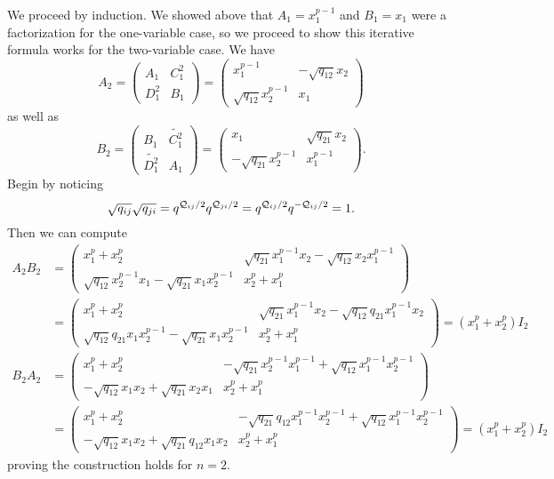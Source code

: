 \documentclass[12pt]{article}
\begin{document}
\begin{prf}
    We proceed by induction. We showed above that $A_1=x_1^{p-1}$ and $B_1=x_1$ were a factorization for the one-variable case, so we proceed to show this iterative formula works for the two-variable case. We have
    \[A_2=\begin{pmatrix}A_1 & C_1^2\\ D_1^2& B_1\end{pmatrix}=\begin{pmatrix}x_1^{p-1} & -\sqrt{q_{12}}x_2\\ \sqrt{q_{12}}x_2^{p-1} & x_1\end{pmatrix}\]
    as well as
    \[B_2=\begin{pmatrix}B_1 & \widetilde{C_1^2}\\\widetilde{D_1^2} & A_1\end{pmatrix}= \begin{pmatrix}x_1 & \sqrt{q_{21}}x_2\\ -\sqrt{q_{21}}x_2^{p-1} & x_1^{p-1}\end{pmatrix}.\]
    Begin by noticing
    \[\sqrt{q_{ij}}\sqrt{q_{ji}} = q^{\mathcal{Q}_{ij}/2}q^{\mathcal{Q}_{ji}/2}=q^{\mathcal{Q}_{ij}/2}q^{-\mathcal{Q}_{ij}/2}=1.\]
    Then we can compute
    \begin{align*}
    A_2B_2&=\begin{pmatrix}x_1^p + x_2^p & \sqrt{q_{21}}x_1^{p-1}x_2 - \sqrt{q_{12}}x_2x_1^{p-1}\\
    \sqrt{q_{12}}x_2^{p-1}x_1 - \sqrt{q_{21}}x_1x_2^{p-1} & x_2^p+x_1^p\end{pmatrix}\\
    &=\begin{pmatrix}x_1^p + x_2^p & \sqrt{q_{21}}x_1^{p-1}x_2 - \sqrt{q_{12}}q_{21}x_1^{p-1}x_2\\
    \sqrt{q_{12}}q_{21}x_1x_2^{p-1} - \sqrt{q_{21}}x_1x_2^{p-1} & x_2^p+x_1^p\end{pmatrix}=(x_1^p+x_2^p)I_2
    \end{align*}
    \begin{align*}
    B_2A_2&=\begin{pmatrix}x_1^p + x_2^p & -\sqrt{q_{21}}x_2^{p-1}x_1^{p-1}+\sqrt{q_{12}}x_1^{p-1}x_2^{p-1}\\
    -\sqrt{q_{12}}x_1x_2 + \sqrt{q_{21}}x_2x_1 & x_2^p+x_1^p\end{pmatrix}\\
    &=\begin{pmatrix}x_1^p + x_2^p & -\sqrt{q_{21}}q_{12}x_1^{p-1}x_2^{p-1}+\sqrt{q_{12}}x_1^{p-1}x_2^{p-1}\\
    -\sqrt{q_{12}}x_1x_2 + \sqrt{q_{21}}q_{12}x_1x_2 & x_2^p+x_1^p\end{pmatrix}=(x_1^p+x_2^p)I_2
    \end{align*}
    proving the construction holds for $n=2$.
    

\end{prf}
\end{document}
